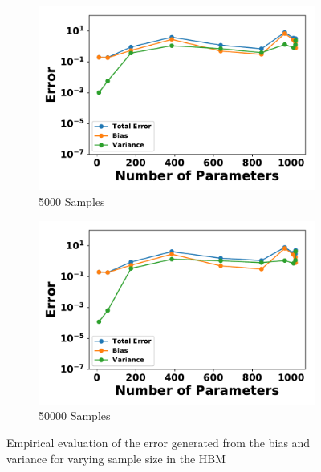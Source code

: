 \documentclass[letterpaper]{article} %
\begin{document}
\begin{figure}[p]
\begin{subfigure}[b]{0.245\textwidth}
              \includegraphics[width=\textwidth]{./HBM_Error_vs_Order_Samples5000-eps-converted-to.pdf}
              \caption{5000 Samples}
          \end{subfigure}
          \begin{subfigure}[b]{0.245\textwidth}
              \centering
              \includegraphics[width=\textwidth]{./HBM_Error_vs_Order_Samples50000-eps-converted-to.pdf}
              \caption{50000 Samples}
          \end{subfigure}
          \caption{Empirical evaluation of the error generated from the bias and variance for varying sample size in the HBM} \label{fig:HBM_hidden_nodes}
        \end{figure}
\end{document}
